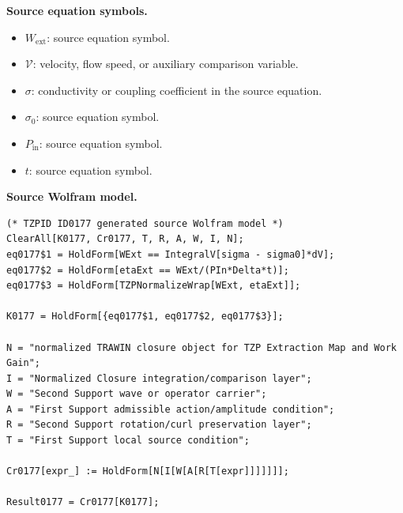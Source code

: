 \begin{minipage}[t]{0.49\linewidth}
\begingroup
\small
\raggedright
\textbf{Source equation symbols.}\par
\begin{itemize}[leftmargin=1.35em,itemsep=1pt,topsep=1pt,parsep=0pt]
    \item $W_{\mathrm{ext}}$: source equation symbol.
    \item $\mathcal{V}$: velocity, flow speed, or auxiliary comparison variable.
    \item $\sigma$: conductivity or coupling coefficient in the source equation.
    \item $\sigma_0$: source equation symbol.
    \item $P_{\mathrm{in}}$: source equation symbol.
    \item $t$: source equation symbol.
\end{itemize}
\endgroup
\end{minipage}\hfill
\begin{minipage}[t]{0.47\linewidth}
\begingroup
\scriptsize
\raggedright
\textbf{Source Wolfram model.}\par
\begin{Verbatim}[fontsize=\tiny,breaklines=true,breakanywhere=true]
(* TZPID ID0177 generated source Wolfram model *)
ClearAll[K0177, Cr0177, T, R, A, W, I, N];
eq0177$1 = HoldForm[WExt == IntegralV[sigma - sigma0]*dV];
eq0177$2 = HoldForm[etaExt == WExt/(PIn*Delta*t)];
eq0177$3 = HoldForm[TZPNormalizeWrap[WExt, etaExt]];

K0177 = HoldForm[{eq0177$1, eq0177$2, eq0177$3}];

N = "normalized TRAWIN closure object for TZP Extraction Map and Work Gain";
I = "Normalized Closure integration/comparison layer";
W = "Second Support wave or operator carrier";
A = "First Support admissible action/amplitude condition";
R = "Second Support rotation/curl preservation layer";
T = "First Support local source condition";

Cr0177[expr_] := HoldForm[N[I[W[A[R[T[expr]]]]]]];

Result0177 = Cr0177[K0177];
\end{Verbatim}
\endgroup
\end{minipage}

